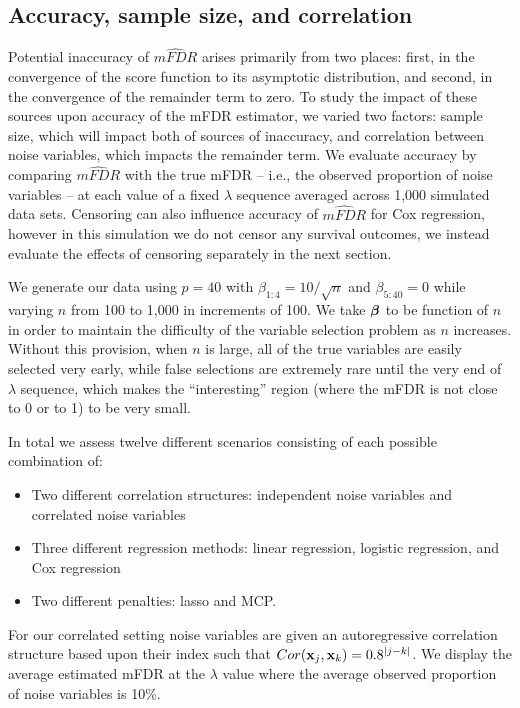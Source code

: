 \subsection{Accuracy, sample size, and correlation}
\label{Sec:accuracy}

Potential inaccuracy of $\widehat{mFDR}$ arises primarily from two places: first, in the convergence of the score function to its asymptotic distribution, and second, in the convergence of the remainder term to zero. To study the impact of these sources upon accuracy of the mFDR estimator, we varied two factors: sample size, which will impact both of sources of inaccuracy, and correlation between noise variables, which impacts the remainder term. We evaluate accuracy by comparing $\widehat{mFDR}$ with the true mFDR -- i.e., the observed proportion of noise variables -- at each value of a fixed $\lambda$ sequence averaged across 1,000 simulated data sets. Censoring can also influence accuracy of $\widehat{mFDR}$ for Cox regression, however in this simulation we do not censor any survival outcomes, we instead evaluate the effects of censoring separately in the next section.


We generate our data using $p = 40$ with $\beta_{1:4} = 10/\sqrt{n}$ and $\beta_{5:40} = 0$ while varying $n$ from 100 to 1,000 in increments of 100. We take $\boldsymbol{\beta}$ to be function of $n$ in order to maintain the difficulty of the variable selection problem as $n$ increases.  Without this provision, when $n$ is large, all of the true variables are easily selected very early, while false selections are extremely rare until the very end of $\lambda$ sequence, which makes the ``interesting'' region (where the mFDR is not close to 0 or to 1) to be very small.

In total we assess twelve different scenarios consisting of each possible combination of:
\begin{itemize}
\item Two different correlation structures: independent noise variables and correlated noise variables
\item Three different regression methods: linear regression, logistic regression, and Cox regression
\item Two different penalties: lasso and MCP. 
\end{itemize}
For our correlated setting noise variables are given an autoregressive correlation structure based upon their index such that $Cor(\mathbf{x}_j,\mathbf{x}_k) = 0.8^{|j - k|}$. We display the average estimated mFDR at the $\lambda$ value where the average observed proportion of noise variables is 10\%.


